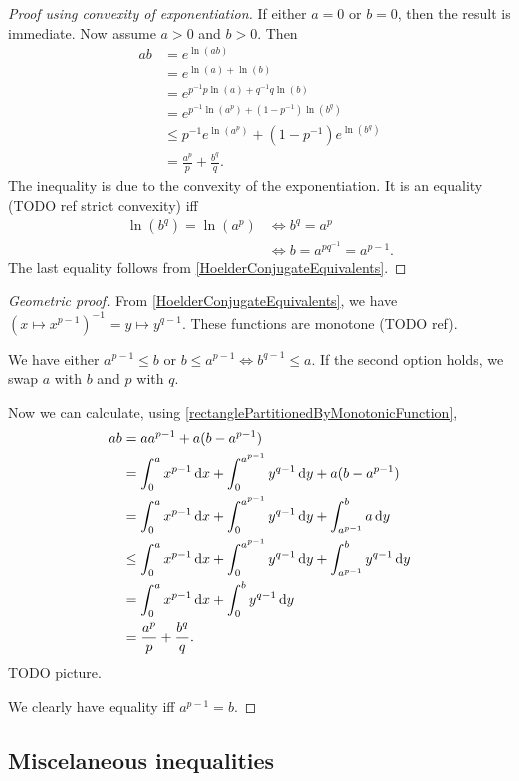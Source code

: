 \begin{proof}[Proof using convexity of exponentiation]
If either $a=0$ or $b =0$, then the result is immediate. Now assume $a>0$ and $b>0$. Then
\begin{align*}
ab &= e^{\ln(ab)} \\
&= e^{\ln(a)+\ln(b)} \\
&= e^{p^{-1}p\ln(a)+q^{-1}q\ln(b)} \\
&= e^{p^{-1}\ln(a^p)+(1-p^{-1})\ln(b^q)} \\
&\leq p^{-1}e^{\ln(a^p)}+(1-p^{-1})e^{\ln(b^q)} \\
&= \frac{a^p}{p} + \frac{b^q}{q}.
\end{align*}
The inequality is due to the convexity of the exponentiation. It is an equality (TODO ref strict convexity) iff
\begin{align*}
\ln(b^q) = \ln(a^p) &\iff b^q = a^p \\
&\iff b = a^{pq^{-1}} = a^{p-1}.
\end{align*}
The last equality follows from \ref{HoelderConjugateEquivalents}.
\end{proof}
\begin{proof}[Geometric proof]
From \ref{HoelderConjugateEquivalents}, we have $(x\mapsto x^{p-1})^{-1} = y\mapsto y^{q-1}$. These functions are monotone (TODO ref).

We have either $a^{p-1}\leq b$ or $b\leq a^{p-1} \iff b^{q-1} \leq a$. If the second option holds, we swap $a$ with $b$ and $p$ with $q$.

Now we can calculate, using \ref{rectanglePartitionedByMonotonicFunction},
\begin{align*}
ab &= aa^{p-1} + a(b-a^{p-1}) \\
&= \int_0^a x^{p-1}\diff{x} + \int_0^{a^{p-1}} y^{q-1}\diff{y} + a(b-a^{p-1}) \\
&= \int_0^a x^{p-1}\diff{x} + \int_0^{a^{p-1}} y^{q-1}\diff{y} + \int_{a^{p-1}}^b a\diff{y} \\
&\leq \int_0^a x^{p-1}\diff{x} + \int_0^{a^{p-1}} y^{q-1}\diff{y} + \int_{a^{p-1}}^b y^{q-1}\diff{y} \\
&= \int_0^a x^{p-1}\diff{x} + \int_0^{b} y^{q-1}\diff{y} \\
&= \frac{a^p}{p} + \frac{b^q}{q}.
\end{align*}
TODO picture.

We clearly have equality iff $a^{p-1} = b$.
\end{proof}

\subsection{Miscelaneous inequalities}

